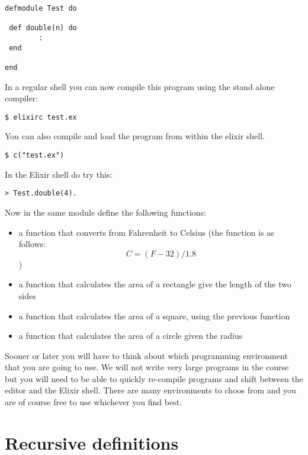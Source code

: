 \documentclass[a4paper,11pt]{article}
\begin{document}
\begin{verbatim}
defmodule Test do

 def double(n) do
        :
 end   

end
\end{verbatim}

In a regular shell you can now compile this program using the stand alone compiler:

\begin{verbatim}
$ elixirc test.ex
\end{verbatim}

You can also compile and load the program from within the elixir shell.

\begin{verbatim}
$ c("test.ex")
\end{verbatim}

In the Elixir shell do try this:

\begin{verbatim}
> Test.double(4).
\end{verbatim}

Now in the same module define the following functions:

\begin{itemize}
\item a function that converts from Fahrenheit to Celsius (the
  function is as follows:$$C = (F-32)/1.8$$)

\item a function that calculates the area of a rectangle give the
  length of the two sides

\item a function that calculates the area of a square, using the
  previous function

\item a function that calculates the area of a circle given the radius
\end{itemize} 

Sooner or later you will have to think about which programming
environment that you are going to use. We will not write very large
programs in the course but you will need to be able to quickly
re-compile programs and shift between the editor and the Elixir
shell. There are many environments to choos from and you are of course
free to use whichever you find best.

\section{Recursive definitions}
\end{document}
